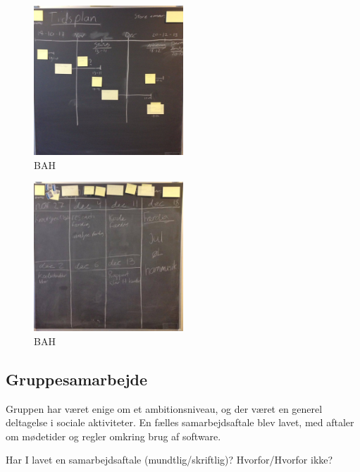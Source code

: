 \documentclass[a4paper,12pt,twoside,openright]{memoir}
\begin{document}
            \begin{figure}[ht!]
                \centering
                \includegraphics[width=0.5\textwidth]{Images/9.jpg}
                \caption{BAH}
                \label{4}
            \end{figure}

            \begin{figure}[ht!]
                \centering
                \includegraphics[width=0.5\textwidth]{Images/2.jpg}
                \caption{BAH}
                \label{4}
            \end{figure}

        \subsection{Gruppesamarbejde}
            
            Gruppen har været enige om et ambitionsniveau, og der været en generel deltagelse i sociale aktiviteter. En fælles samarbejdsaftale blev lavet, med aftaler om mødetider og regler omkring brug af software.

            Har I lavet en samarbejdsaftale (mundtlig/skriftlig)? Hvorfor/Hvorfor ikke? 
            
\end{document}
